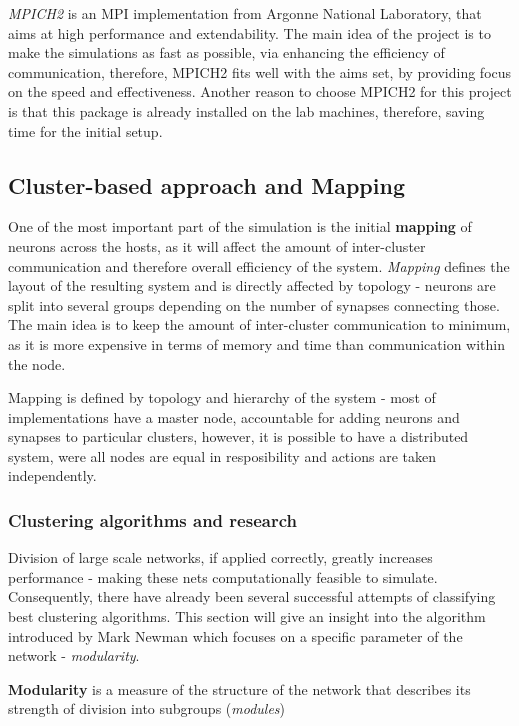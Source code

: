 \emph{MPICH2} is an MPI implementation from Argonne National Laboratory, that aims at high performance and extendability.\cite{W.Gropp1999} The main idea of the project is to make the simulations as
fast as possible, via enhancing the efficiency of communication, therefore, MPICH2 fits well with the aims set, by providing focus on the speed and effectiveness. Another reason to choose 
MPICH2 for this project is that this package is already installed on the lab machines, therefore, saving time for the initial setup.\cite{W.Gropp1999a}

\subsection{Cluster-based approach and Mapping}

One of the most important part of the simulation is the initial \textbf{mapping} of neurons across the hosts, as it will affect the amount of inter-cluster communication and therefore overall efficiency of the system. \emph{Mapping} defines the layout of the resulting system and is directly affected by topology - neurons are split into several groups depending on the number of synapses connecting those. The main idea is to keep the amount of inter-cluster communication to minimum, as it is more expensive in terms of memory and time than communication within the node.

Mapping is defined by topology and hierarchy of the system - most of implementations have a master node, accountable for adding neurons and synapses to particular clusters, however, it is
possible to have a distributed system, were all nodes are equal in resposibility and actions are taken independently.

\subsubsection{Clustering algorithms and research}

Division of large scale networks, if applied correctly, greatly increases performance - making these nets computationally feasible to simulate. Consequently, there have already been several successful attempts of classifying best clustering algorithms. This section will give an insight into the algorithm introduced by Mark Newman which focuses on a specific parameter of the network - \emph{modularity}.

\textbf{Modularity} is a measure of the structure of the network that describes its strength of division into subgroups (\emph{modules})

